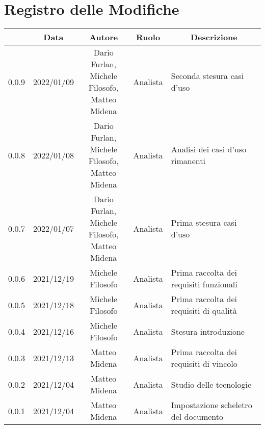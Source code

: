 \thispagestyle{empty}
\section*{Registro delle Modifiche}

\begin{center}
	\renewcommand{\arraystretch}{1.8}
	\begin{longtable}[c]{c | c | c | c | p{5cm}}
		\rowcolor[HTML]{125E28}
		\multicolumn{1}{c}{\color[HTML]{FFFFFF} \textbf{Versione}} & 
		\multicolumn{1}{c}{\color[HTML]{FFFFFF} \textbf{Data}} & 
		\multicolumn{1}{c}{\color[HTML]{FFFFFF} \textbf{Autore}} & 
		\multicolumn{1}{c}{\color[HTML]{FFFFFF} \textbf{Ruolo}} & 
		\multicolumn{1}{c}{\color[HTML]{FFFFFF} \textbf{Descrizione}} \\
		\endhead
		0.0.9 & 2022/01/09 & \shortstack{Dario Furlan,\\ Michele Filosofo,\\ Matteo Midena} & Analista & Seconda stesura casi d'uso \\
		0.0.8 & 2022/01/08 & \shortstack{Dario Furlan,\\ Michele Filosofo,\\ Matteo Midena} & Analista & Analisi dei casi d'uso rimanenti \\
		0.0.7 & 2022/01/07 & \shortstack{Dario Furlan,\\ Michele Filosofo,\\ Matteo Midena} & Analista & Prima stesura casi d'uso \\
		0.0.6 & 2021/12/19 & Michele Filosofo & Analista & Prima raccolta dei requisiti funzionali \\
		0.0.5 & 2021/12/18 & Michele Filosofo & Analista & Prima raccolta dei requisiti di qualità \\
		0.0.4 & 2021/12/16 & Michele Filosofo & Analista & Stesura introduzione \\
		0.0.3 & 2021/12/13 & Matteo Midena & Analista & Prima raccolta dei requisiti di vincolo \\
		0.0.2 & 2021/12/04 & Matteo Midena & Analista & Studio delle tecnologie\\
		0.0.1 & 2021/12/04 & Matteo Midena & Analista & Impostazione scheletro del documento\\
	\end{longtable}
\end{center}